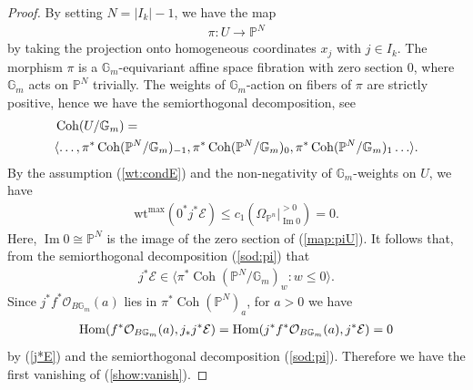 \documentclass [11pt,oneside,a4paper,mathscr]{amsart}
\theoremstyle{definition}
\renewcommand{\leq}{\leqslant}
\newcommand{\bgm}{B\mathbb{G}_m}
\newcommand{\Coh}{\operatorname{Coh}}
\newcommand{\Hom}{\operatorname{Hom}}
\renewcommand{\Im}{\operatorname{Im}}
\newcommand{\wt}{\mathrm{wt}}
\begin{document}
\begin{proof}
    
By setting $N=\lvert I_k \rvert -1$, 
we have the map 
\begin{align}\label{map:piU}
\pi \colon U \to \mathbb{P}^{N}    
\end{align}
by taking the projection onto homogeneous 
coordinates $x_j$ with $j\in I_k$. 
The morphism $\pi$ is a $\mathbb{G}_m$-equivariant affine space fibration 
with zero section $0$, where $\mathbb{G}_m$ acts on 
$\mathbb{P}^{N}$ trivially. 
The weights of $\mathbb{G}_m$-action on 
fibers of $\pi$ are strictly positive, hence 
we have the semiorthogonal decomposition, see~\cite[Amplification~3.18]{halp}
\begin{align}\label{sod:pi}
&\Coh(U/\mathbb{G}_m)= \\
\notag &\langle 
\ldots, \pi^{\ast}\Coh(\mathbb{P}^N/\mathbb{G}_m)_{-1}, 
\pi^{\ast}\Coh(\mathbb{P}^N/\mathbb{G}_m)_0, 
\pi^{\ast}\Coh(\mathbb{P}^N/\mathbb{G}_m)_1
\ldots \rangle.  
\end{align}
By the assumption (\ref{wt:condE}) and 
the non-negativity of $\mathbb{G}_m$-weights on $U$, 
we have 
\begin{align*}
\wt^{\mathrm{max}}(0^{\ast}j^{\ast}\mathcal{E}) \leq 
c_1(\Omega_{\mathbb{P}^n}|_{\Im 0}^{>0})=0. 
\end{align*} Here, $\Im 0 \cong \mathbb{P}^N$ is the image of the zero section of (\ref{map:piU}).
    It follows that, from the semiorthogonal 
    decomposition (\ref{sod:pi}) that 
\begin{align}\label{j*E}
j^{\ast}\mathcal{E} \in \langle \pi^{\ast}\Coh(\mathbb{P}^N/\mathbb{G}_m)_w :
w\leq 0\rangle. 
\end{align}
Since $j^{\ast}f^{\ast}\mathcal{O}_{\bgm}(a)$
lies in $\pi^{\ast}\Coh(\mathbb{P}^N)_a$, for $a>0$ 
we have 
\begin{align}\notag
    \Hom(f^{\ast}\mathcal{O}_{\bgm}(a), j_{\ast}j^{\ast}\mathcal{E})
    =\Hom(j^{\ast}f^{\ast}\mathcal{O}_{\bgm}(a), j^{\ast}\mathcal{E})
    =0
\end{align}
by (\ref{j*E}) and the semiorthogonal decomposition (\ref{sod:pi}). 
Therefore we have the first vanishing of (\ref{show:vanish}). 


\end{proof}
\end{document}
